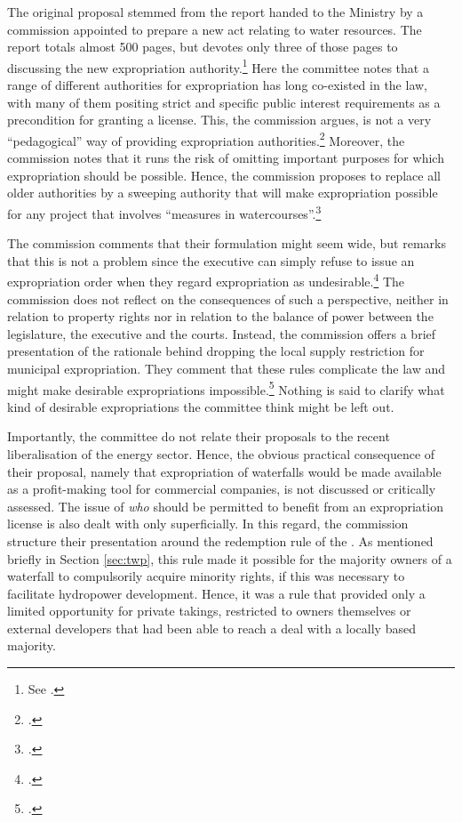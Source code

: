 The original proposal stemmed from the report handed to the Ministry by a commission appointed to prepare a new act relating to water resources. The report totals almost 500 pages, but devotes only three of those pages to discussing the new expropriation authority.\footnote{See \cite[235-237]{nou094}.} Here the committee notes that a range of different authorities for expropriation has long co-existed in the law, with many of them positing strict and specific public interest requirements as a precondition for granting a license. This, the commission argues, is not a very ``pedagogical'' way of providing expropriation authorities.\footcite[235]{nou94} Moreover, the commission notes that it runs the risk of omitting important purposes for which expropriation should be possible. Hence, the commission proposes to replace all older authorities by a sweeping authority that will make expropriation possible for any project that involves ``measures in watercourses''.\footcite[235-236]{nou94}

The commission comments that their formulation might seem wide, but remarks that this is not a problem since the executive can simply refuse to issue an expropriation order when they regard expropriation as undesirable.\footcite[235]{nou94} The commission does not reflect on the consequences of such a perspective, neither in relation to property rights nor in relation to the balance of power between the legislature, the executive and the courts. Instead, the commission offers a brief presentation of the rationale behind dropping the local supply restriction for municipal expropriation. They comment that these rules complicate the law and might make desirable expropriations impossible.\footcite[235]{nou94} Nothing is said to clarify what kind of desirable expropriations the committee think might be left out. 

Importantly, the committee do not relate their proposals to the recent liberalisation of the energy sector. Hence, the obvious practical consequence of their proposal, namely that expropriation of waterfalls would be made available as a profit-making tool for commercial companies, is not discussed or critically assessed. The issue of {\it who} should be permitted to benefit from an expropriation license is also dealt with only superficially. In this regard, the commission structure their presentation around the redemption rule of the \cite{wra40}. As mentioned briefly in Section \ref{sec:twp}, this rule made it possible for the majority owners of a waterfall to compulsorily acquire minority rights, if this was necessary to facilitate hydropower development. Hence, it was a rule that provided only a limited opportunity for private takings, restricted to owners themselves or external developers that had been able to reach a deal with a locally based majority.

